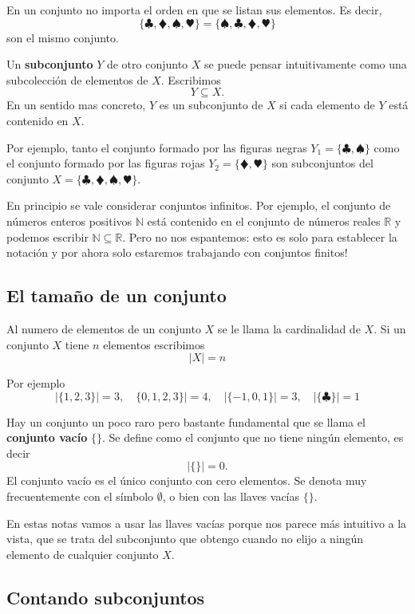 En un conjunto no importa el orden en que se listan sus elementos. Es decir, $$\{\clubsuit,\vardiamondsuit,\spadesuit,\varheartsuit\} =\{\spadesuit,\clubsuit,\vardiamondsuit,\varheartsuit\}$$ son el mismo conjunto.

Un {\bf subconjunto} $Y$ de otro conjunto $X$  se puede pensar intuitivamente como una subcolección de elementos de $X$. Escribimos $$Y\subseteq X.$$ En un sentido mas concreto, $Y$ es un subconjunto de $X$ si cada elemento de $Y$ está contenido en $X$.

Por ejemplo, tanto el conjunto formado por las figuras negras $Y_1 = \{\clubsuit,\spadesuit\}$ como el conjunto formado por las figuras rojas $Y_2 ={\{\vardiamondsuit,\varheartsuit\} }$ son subconjuntos del conjunto $X=\{\clubsuit,\vardiamondsuit,\spadesuit,\varheartsuit\}$.

En principio se vale considerar conjuntos infinitos. Por ejemplo, el conjunto de números enteros positivos $\mathbb N$ está contenido en el conjunto de números reales $\mathbb R$ y podemos escribir $\mathbb N\subseteq \mathbb R$. Pero no nos espantemos: esto es solo para establecer la notación y por ahora solo estaremos trabajando con conjuntos finitos!

\subsection{El tamaño de un conjunto}

Al numero de elementos de un conjunto $X$ se le llama la cardinalidad de $X$. Si un conjunto $X$ tiene $n$ elementos escribimos $$|X|=n$$

Por ejemplo $$|\{1,2,3\}| = 3,\quad\{0,1,2,3\}| = 4,\quad |\{-1,0,1\}| = 3,\quad |\{\clubsuit\}| = 1$$ 

Hay un conjunto un poco raro pero bastante fundamental que se llama el {\bf conjunto vacío} $\{\}$. Se define como el conjunto que no tiene ningún elemento, es decir $$|\{\}|=0.$$ El conjunto vacío es el único conjunto con cero elementos. Se denota muy frecuentemente con el símbolo $\emptyset$, o bien con las llaves vacías $\{\}$. 

En estas notas vamos a usar las llaves vacías porque nos parece más intuitivo a la vista, que se trata del subconjunto que obtengo cuando no elijo a ningún elemento de cualquier conjunto $X$. 

\subsection{Contando subconjuntos}


